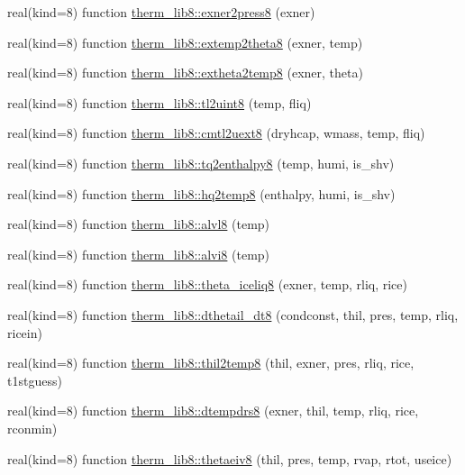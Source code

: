 \begin{DoxyCompactItemize}
real(kind=8) function \hyperlink{namespacetherm__lib8_a790e9ad68221393de29c2383a301da8e}{therm\+\_\+lib8\+::exner2press8} (exner)
\item 
real(kind=8) function \hyperlink{namespacetherm__lib8_a309e38d181bfb3eea47d3f220e44b923}{therm\+\_\+lib8\+::extemp2theta8} (exner, temp)
\item 
real(kind=8) function \hyperlink{namespacetherm__lib8_ac210423ab55881e57a525b8f13593fa3}{therm\+\_\+lib8\+::extheta2temp8} (exner, theta)
\item 
real(kind=8) function \hyperlink{namespacetherm__lib8_afb21e6b55b53bbc124c228e01ccc60cb}{therm\+\_\+lib8\+::tl2uint8} (temp, fliq)
\item 
real(kind=8) function \hyperlink{namespacetherm__lib8_af5c7259346e1ee029458410d49100d77}{therm\+\_\+lib8\+::cmtl2uext8} (dryhcap, wmass, temp, fliq)
\item 
real(kind=8) function \hyperlink{namespacetherm__lib8_abc11d3a9518a513fd0b3b97e6fc0e68e}{therm\+\_\+lib8\+::tq2enthalpy8} (temp, humi, is\+\_\+shv)
\item 
real(kind=8) function \hyperlink{namespacetherm__lib8_a1ffd2b0e4437b77b168fa1df97e641ca}{therm\+\_\+lib8\+::hq2temp8} (enthalpy, humi, is\+\_\+shv)
\item 
real(kind=8) function \hyperlink{namespacetherm__lib8_a8dfe9d6c06c19f28e388354ce1001ec2}{therm\+\_\+lib8\+::alvl8} (temp)
\item 
real(kind=8) function \hyperlink{namespacetherm__lib8_a3b1992f0fffee3a316b79819cac27382}{therm\+\_\+lib8\+::alvi8} (temp)
\item 
real(kind=8) function \hyperlink{namespacetherm__lib8_a7d5573528d5f5adeb9beb594eead7f4f}{therm\+\_\+lib8\+::theta\+\_\+iceliq8} (exner, temp, rliq, rice)
\item 
real(kind=8) function \hyperlink{namespacetherm__lib8_acd882aa1f52e8cbaee8065ca35eb5867}{therm\+\_\+lib8\+::dthetail\+\_\+dt8} (condconst, thil, pres, temp, rliq, ricein)
\item 
real(kind=8) function \hyperlink{namespacetherm__lib8_a7d009d0d3507e656b58c9eb70c747598}{therm\+\_\+lib8\+::thil2temp8} (thil, exner, pres, rliq, rice, t1stguess)
\item 
real(kind=8) function \hyperlink{namespacetherm__lib8_af3b110a715728849ed26074d4675f0e8}{therm\+\_\+lib8\+::dtempdrs8} (exner, thil, temp, rliq, rice, rconmin)
\item 
real(kind=8) function \hyperlink{namespacetherm__lib8_aca0eeff24415eab272c13efcba42ebd5}{therm\+\_\+lib8\+::thetaeiv8} (thil, pres, temp, rvap, rtot, useice)

\end{DoxyCompactItemize}

